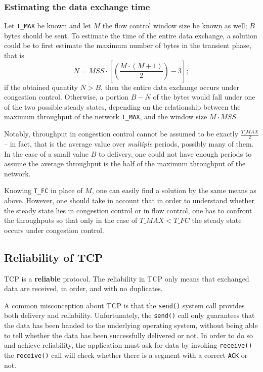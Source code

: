\documentclass[10pt]{extbook}
\begin{document}
\subsubsection{Estimating the data exchange time}

Let \texttt{T\_MAX} be known and let $M$ the flow control window size be known
as well; $B$ bytes should be sent. To estimate the time of the entire data
exchange, a solution could be to first estimate the maximum number of bytes in
the transient phase, that is $$N = MSS \cdot [(\frac{M \cdot (M + 1)}{2}) -
3];$$ if the obtained quantity $N > B$, then the entire data exchange occurs
under congestion control. Otherwise, a portion $B - N$ of the bytes would fall
under one of the two possible steady states, depending on the relationship
between the maximum throughput of the network \texttt{T\_MAX}, and the window
size $M \cdot MSS$.

Notably, throughput in congestion control cannot be assumed to be exactly
$\frac{T\_MAX}{2}$ -- in fact, that is the average value over \emph{multiple}
periods, possibly many of them. In the case of a small value $B$ to delivery,
one could not have enough periods to assume the average throughput is the half
of the maximum throughput of the network.

Knowing \texttt{T\_FC} in place of $M$, one can easily find a solution by the
same means as above. However, one should take in account that in order to
understand whether the steady state lies in congestion control or in flow
control, one has to confront the throughputs so that only in the case of
$T\_MAX < T\_FC$ the steady state occurs under congestion control.

\subsection{Reliability of TCP}

TCP is a \textbf{reliable} protocol. The reliability in TCP only means that
exchanged data are received, in order, and with no duplicates.

A common misconception about TCP is that the \texttt{send()} system call
provides both delivery and reliability. Unfortunately, the \texttt{send()} call
only guarantees that the data has been handed to the underlying operating
system, without being able to tell whether the data has been successfully
delivered or not. In order to do so and achieve reliability, the application
must ask for data by invoking \texttt{receive()} -- the \texttt{receive()} call
will check whether there is a segment with a correct \texttt{ACK} or not.
\end{document}
